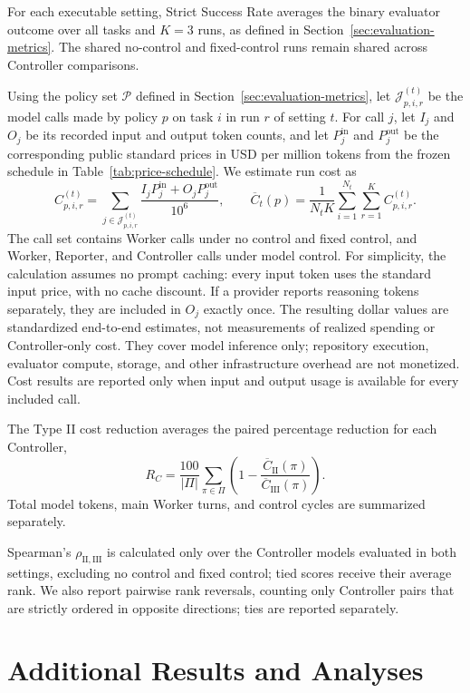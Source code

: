 For each executable setting, Strict Success Rate averages the binary evaluator outcome over all tasks and \(K=3\) runs, as defined in Section~\ref{sec:evaluation-metrics}. The shared no-control and fixed-control runs remain shared across Controller comparisons.

Using the policy set \(\mathcal{P}\) defined in Section~\ref{sec:evaluation-metrics}, let \(\mathcal{J}^{(t)}_{p,i,r}\) be the model calls made by policy \(p\) on task \(i\) in run \(r\) of setting \(t\). For call \(j\), let \(I_j\) and \(O_j\) be its recorded input and output token counts, and let \(P^{\mathrm{in}}_j\) and \(P^{\mathrm{out}}_j\) be the corresponding public standard prices in USD per million tokens from the frozen schedule in Table~\ref{tab:price-schedule}. We estimate run cost as
\[
C^{(t)}_{p,i,r}
=
\sum_{j\in\mathcal{J}^{(t)}_{p,i,r}}
\frac{I_jP^{\mathrm{in}}_j+O_jP^{\mathrm{out}}_j}{10^6},
\qquad
\overline{C}_{t}(p)
=
\frac{1}{N_tK}
\sum_{i=1}^{N_t}\sum_{r=1}^{K}C^{(t)}_{p,i,r}.
\]
The call set contains Worker calls under no control and fixed control, and Worker, Reporter, and Controller calls under model control. For simplicity, the calculation assumes no prompt caching: every input token uses the standard input price, with no cache discount. If a provider reports reasoning tokens separately, they are included in \(O_j\) exactly once. The resulting dollar values are standardized end-to-end estimates, not measurements of realized spending or Controller-only cost. They cover model inference only; repository execution, evaluator compute, storage, and other infrastructure overhead are not monetized. Cost results are reported only when input and output usage is available for every included call.

The Type II cost reduction averages the paired percentage reduction for each Controller,
\[
R_C
=
\frac{100}{|\Pi|}
\sum_{\pi\in\Pi}
\left(
1-
\frac{\overline{C}_{\mathrm{II}}(\pi)}
{\overline{C}_{\mathrm{III}}(\pi)}
\right).
\]
Total model tokens, main Worker turns, and control cycles are summarized separately.

Spearman's \(\rho_{\mathrm{II},\mathrm{III}}\) is calculated only over the Controller models evaluated in both settings, excluding no control and fixed control; tied scores receive their average rank. We also report pairwise rank reversals, counting only Controller pairs that are strictly ordered in opposite directions; ties are reported separately.

\section{Additional Results and Analyses}
\label{app:additional-results}

